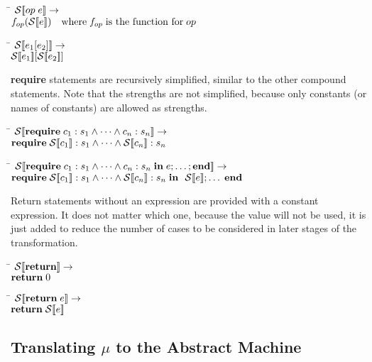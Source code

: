 %
\begin{tabbing}
\qquad \= \quad \kill
${\mathcal{S}{\normalfont [\![} op\; e {\normalfont ]\!]}} \rightarrow$\\
\>$f_{op}({\mathcal{S}{\normalfont [\![} e {\normalfont ]\!]}})\quad\text{where}\;f_{op}\;\text{is the function for}\; op$
\end{tabbing}
%
\begin{tabbing}
\qquad \= \quad \kill
${\mathcal{S}{\normalfont [\![} e_1[e_2] {\normalfont ]\!]}} \rightarrow$\\
\>${\mathcal{S}{\normalfont [\![} e_1 {\normalfont ]\!]}}[{\mathcal{S}{\normalfont [\![} e_2 {\normalfont ]\!]}}]$
\end{tabbing}
%
{\bf require} statements are recursively simplified, similar to the
other compound statements.  Note that the strengths are not
simplified, because only constants (or names of constants) are allowed
as strengths.
%
\begin{tabbing}
\qquad \= \quad \kill
${\mathcal{S}{\normalfont [\![} \text{\bf require}\; c_1 : s_1 \wedge\dots\wedge c_n : s_n {\normalfont ]\!]}} \rightarrow$\\
\>$\text{\bf require}\; {\mathcal{S}{\normalfont [\![} c_1 {\normalfont ]\!]}} : s_1 \wedge\dots\wedge {\mathcal{S}{\normalfont [\![}c_n {\normalfont ]\!]}} : s_n\;$
\end{tabbing}
%
\begin{tabbing}
\qquad \= \quad \kill
${\mathcal{S}{\normalfont [\![} \text{\bf require}\; c_1 : s_1 \wedge\dots\wedge c_n : s_n\;\text{\bf in}\;e;\dots;\text{\bf end} {\normalfont ]\!]}} \rightarrow$\\
\>$\text{\bf require}\; {\mathcal{S}{\normalfont [\![} c_1 {\normalfont ]\!]}} : s_1 \wedge\dots\wedge {\mathcal{S}{\normalfont [\![}c_n {\normalfont ]\!]}} : s_n\;\text{\bf in }\;{\mathcal{S}{\normalfont [\![} e {\normalfont ]\!]}};\dots\;\text{\bf end}$
\end{tabbing}
%
Return statements without an expression are provided with a constant
expression.  It does not matter which one, because the value will not
be used, it is just added to reduce the number of cases to be
considered in later stages of the transformation.
%
\begin{tabbing}
\qquad \= \quad \kill
${\mathcal{S}{\normalfont [\![} \text{\bf return} {\normalfont ]\!]}} \rightarrow$\\
\>$\text{\bf return}\; 0$
\end{tabbing}
%
\begin{tabbing}
\qquad \= \quad \kill
${\mathcal{S}{\normalfont [\![} \text{\bf return}\; e {\normalfont ]\!]}} \rightarrow$\\
\>$\text{\bf return}\; {\mathcal{S}{\normalfont [\![} e {\normalfont ]\!]}}$
\end{tabbing}

\subsection{Translating $\mu$\turtle{} to the \turtle{} Abstract Machine}

